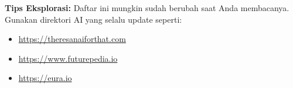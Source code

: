 \begin{tipbox}
    \textbf{Tips Eksplorasi:} Daftar ini mungkin sudah berubah saat Anda membacanya. Gunakan direktori AI yang selalu update seperti:
    \begin{itemize}
        \item \url{https://theresanaiforthat.com}
        \item \url{https://www.futurepedia.io}
        \item \url{https://eura.io}
    \end{itemize}
\end{tipbox}
